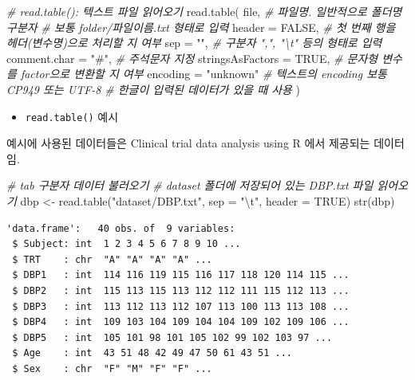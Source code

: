 \documentclass[
  11pt,
]{krantz}
\makeatletter
\newenvironment{Shaded}{\begin{snugshade}}{\end{snugshade}}
\newcommand{\AttributeTok}[1]{\textcolor[rgb]{0.61,0.61,0.61}{#1}}
\newcommand{\CommentTok}[1]{\textcolor[rgb]{0.37,0.37,0.37}{\textit{#1}}}
\newcommand{\ConstantTok}[1]{\textcolor[rgb]{0,0,0}{#1}}
\newcommand{\FunctionTok}[1]{\textcolor[rgb]{0,0,0}{#1}}
\newcommand{\NormalTok}[1]{#1}
\newcommand{\OtherTok}[1]{\textcolor[rgb]{0.37,0.37,0.37}{#1}}
\newcommand{\SpecialCharTok}[1]{\textcolor[rgb]{0,0,0}{#1}}
\newcommand{\StringTok}[1]{\textcolor[rgb]{0.5,0.5,0.5}{#1}}
\providecommand{\tightlist}{%
  \setlength{\itemsep}{0pt}\setlength{\parskip}{0pt}}
\newenvironment{kframe}{%
\medskip{}
\setlength{\fboxsep}{.8em}
 \def\at@end@of@kframe{}%
 \ifinner\ifhmode%
  \def\at@end@of@kframe{\end{minipage}}%
  \begin{minipage}{\columnwidth}%
 \fi\fi%
 \def\FrameCommand##1{\hskip\@totalleftmargin \hskip-\fboxsep
 \colorbox{shadecolor}{##1}\hskip-\fboxsep
     \hskip-\linewidth \hskip-\@totalleftmargin \hskip\columnwidth}%
 \MakeFramed {\advance\hsize-\width
   \@totalleftmargin\z@ \linewidth\hsize
   \@setminipage}}%
 {\par\unskip\endMakeFramed%
 \at@end@of@kframe}
\newenvironment{rmdblock}[1]
  {
  \begin{itemize}
  \renewcommand{\labelitemi}{
    \raisebox{-.7\height}[0pt][0pt]{
      {\setkeys{Gin}{width=3em,keepaspectratio}\texttt{[image: images/\#1]}}
    }
  }
  \setlength{\fboxsep}{1em}
  \begin{kframe}
  \item
  }
  {
  \end{kframe}
  \end{itemize}
  }
\newenvironment{rmdnote}
  {\begin{rmdblock}{note}}
  {\end{rmdblock}}
\makeatother
\begin{document}
\footnotesize

\begin{Shaded}
\begin{Highlighting}[]
\CommentTok{\# read.table(): 텍스트 파일 읽어오기}
\FunctionTok{read.table}\NormalTok{(}
\NormalTok{  file, }\CommentTok{\# 파일명. 일반적으로 폴더명 구분자 }
        \CommentTok{\# 보통 folder/파일이름.txt 형태로 입력}
  \AttributeTok{header =} \ConstantTok{FALSE}\NormalTok{, }\CommentTok{\# 첫 번째 행을 헤더(변수명)으로 처리할 지 여부}
  \AttributeTok{sep =} \StringTok{""}\NormalTok{, }\CommentTok{\# 구분자 ",", "\textbackslash{}t" 등의 형태로 입력}
  \AttributeTok{comment.char =} \StringTok{"\#"}\NormalTok{, }\CommentTok{\# 주석문자 지정}
  \AttributeTok{stringsAsFactors =} \ConstantTok{TRUE}\NormalTok{, }\CommentTok{\# 문자형 변수를 factor으로 변환할 지 여부}
  \AttributeTok{encoding =} \StringTok{"unknown"} \CommentTok{\# 텍스트의 encoding 보통 CP949 또는 UTF{-}8}
                       \CommentTok{\# 한글이 입력된 데이터가 있을 때 사용}
\NormalTok{)}
\end{Highlighting}
\end{Shaded}

\normalsize

\begin{itemize}
\tightlist
\item
  \texttt{read.table()} 예시
\end{itemize}

\footnotesize

\begin{rmdnote}
예시에 사용된 데이터들은 Clinical trial data analysis using R \citep{chen-2010}에서 제공되는 데이터임.
\end{rmdnote}

\normalsize

\footnotesize

\begin{Shaded}
\begin{Highlighting}[]
\CommentTok{\# tab 구분자 데이터 불러오기}
\CommentTok{\# dataset 폴더에 저장되어 있는 DBP.txt 파일 읽어오기}
\NormalTok{dbp }\OtherTok{\textless{}{-}} \FunctionTok{read.table}\NormalTok{(}\StringTok{"dataset/DBP.txt"}\NormalTok{, }\AttributeTok{sep =} \StringTok{"}\SpecialCharTok{\textbackslash{}t}\StringTok{"}\NormalTok{, }\AttributeTok{header =} \ConstantTok{TRUE}\NormalTok{)}
\FunctionTok{str}\NormalTok{(dbp)}
\end{Highlighting}
\end{Shaded}

\begin{verbatim}
'data.frame':   40 obs. of  9 variables:
 $ Subject: int  1 2 3 4 5 6 7 8 9 10 ...
 $ TRT    : chr  "A" "A" "A" "A" ...
 $ DBP1   : int  114 116 119 115 116 117 118 120 114 115 ...
 $ DBP2   : int  115 113 115 113 112 112 111 115 112 113 ...
 $ DBP3   : int  113 112 113 112 107 113 100 113 113 108 ...
 $ DBP4   : int  109 103 104 109 104 104 109 102 109 106 ...
 $ DBP5   : int  105 101 98 101 105 102 99 102 103 97 ...
 $ Age    : int  43 51 48 42 49 47 50 61 43 51 ...
 $ Sex    : chr  "F" "M" "F" "F" ...
\end{verbatim}
\end{document}
